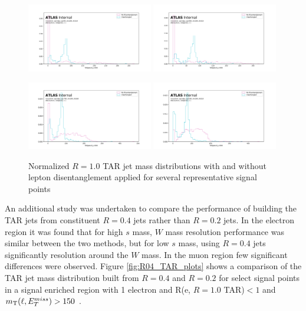 \begin{figure}[!h]
\centering
   \includegraphics[width = 0.49\textwidth]{Figures/4/TAR/monoSww_semilep_zp500_dm200_dh310.png}
   \includegraphics[width = 0.49\textwidth]{Figures/4/TAR/monoSww_semilep_zp1000_dm200_dh310.png}

   \includegraphics[width = 0.49\textwidth]{Figures/4/TAR/monoSww_semilep_zp1700_dm200_dh260.png}
   \includegraphics[width = 0.49\textwidth]{Figures/4/TAR/monoSww_semilep_zp2100_dm200_dh210.png}

   \caption{Normalized $R=1.0$ TAR jet mass distributions with and without lepton disentanglement applied for several representative signal points}
   \label{fig:TARdisentaglementplots}
\end{figure}


An additional study was undertaken to compare the performance of building the TAR jets from constituent \akt $R=0.4$ jets rather than \akt $R=0.2$ jets.
In the electron region it was found that for high $s$ mass, $W$ mass resolution performance was similar between the two methods, but for low $s$ mass, using \akt $R=0.4$ jets significantly resolution around the $W$ mass.
In the muon region few significant differences were observed.
Figure \ref{fig:R04_TAR_plots} shows a comparison of the TAR jet mass distribution built from \akt $R=0.4$ and \akt $R=0.2$ for select signal points in a signal enriched region with 1 electron and \Delta R(e, $R=1.0$ TAR)$< 1$ and $m_{\text{T}}(\ell, E_{T}^{miss}) > 150$ \GeV.

